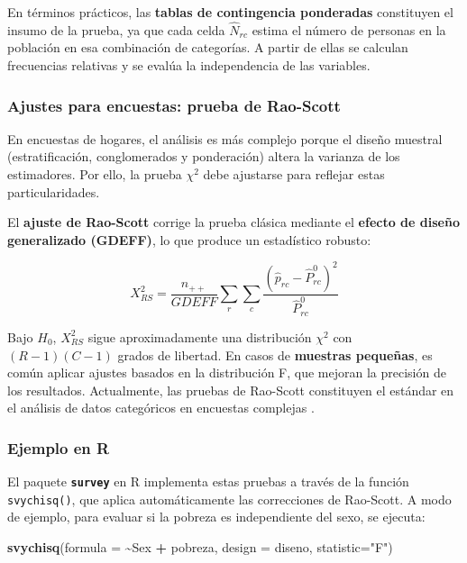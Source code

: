\documentclass[
  spanish,
  12pt,
]{book}
\newenvironment{Shaded}{\begin{snugshade}}{\end{snugshade}}
\newcommand{\AttributeTok}[1]{\textcolor[rgb]{0.13,0.29,0.53}{#1}}
\newcommand{\FunctionTok}[1]{\textcolor[rgb]{0.13,0.29,0.53}{\textbf{#1}}}
\newcommand{\NormalTok}[1]{#1}
\newcommand{\SpecialCharTok}[1]{\textcolor[rgb]{0.81,0.36,0.00}{\textbf{#1}}}
\newcommand{\StringTok}[1]{\textcolor[rgb]{0.31,0.60,0.02}{#1}}
\begin{document}
En términos prácticos, las \textbf{tablas de contingencia ponderadas} constituyen el insumo de la prueba, ya que cada celda \(\hat{N}_{rc}\) estima el número de personas en la población en esa combinación de categorías. A partir de ellas se calculan frecuencias relativas y se evalúa la independencia de las variables.

\subsubsection{Ajustes para encuestas: prueba de Rao-Scott}\label{ajustes-para-encuestas-prueba-de-rao-scott}

En encuestas de hogares, el análisis es más complejo porque el diseño muestral (estratificación, conglomerados y ponderación) altera la varianza de los estimadores. Por ello, la prueba \(\chi^{2}\) debe ajustarse para reflejar estas particularidades.

El \textbf{ajuste de Rao-Scott} \citep{rao1984chisquare, thomas1987chisquare} corrige la prueba clásica mediante el \textbf{efecto de diseño generalizado (GDEFF)}, lo que produce un estadístico robusto:

\[
X_{RS}^2 = \frac{n_{++}}{GDEFF} \sum_r \sum_c \frac{(\hat{p}_{rc} - \hat{P}_{rc}^0)^2}{\hat{P}_{rc}^0}
\]

Bajo \(H_0\), \(X_{RS}^2\) sigue aproximadamente una distribución \(\chi^2\) con \((R-1)(C-1)\) grados de libertad. En casos de \textbf{muestras pequeñas}, es común aplicar ajustes basados en la distribución F, que mejoran la precisión de los resultados. Actualmente, las pruebas de Rao-Scott constituyen el estándar en el análisis de datos categóricos en encuestas complejas \citep{heeringa2017applied}.

\subsubsection{Ejemplo en R}\label{ejemplo-en-r}

El paquete \textbf{\texttt{survey}} en R implementa estas pruebas a través de la función \texttt{svychisq()}, que aplica automáticamente las correcciones de Rao-Scott. A modo de ejemplo, para evaluar si la pobreza es independiente del sexo, se ejecuta:

\begin{Shaded}
\begin{Highlighting}[]
\FunctionTok{svychisq}\NormalTok{(}\AttributeTok{formula =} \SpecialCharTok{\textasciitilde{}}\NormalTok{Sex }\SpecialCharTok{+}\NormalTok{ pobreza, }\AttributeTok{design =}\NormalTok{ diseno, }\AttributeTok{statistic=}\StringTok{"F"}\NormalTok{)}
\end{Highlighting}
\end{Shaded}
\end{document}
